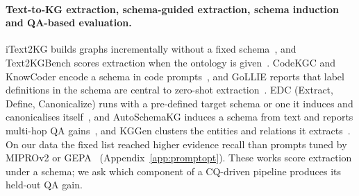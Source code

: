 \paragraph{Text-to-KG extraction, schema-guided extraction, schema induction and QA-based evaluation.}
iText2KG builds graphs incrementally without a fixed schema~\cite{lairgi2024itext2kg}, and Text2KGBench scores extraction when the ontology is given~\cite{mihindukulasooriya2023text2kgbench}. CodeKGC and KnowCoder encode a schema in code prompts~\cite{bi2024codekgc,li2024knowcoder}, and GoLLIE reports that label definitions in the schema are central to zero-shot extraction~\cite{sainz2024gollie}. EDC (Extract, Define, Canonicalize) runs with a pre-defined target schema or one it induces and canonicalises itself~\cite{zhang2024edc}, and AutoSchemaKG induces a schema from text and reports multi-hop QA gains~\cite{bai2026autoschemakg}, and KGGen clusters the entities and relations it extracts~\cite{mo2025kggen}. On our data the fixed list reached higher evidence recall than prompts tuned by MIPROv2 or GEPA~\cite{opsahlong2024mipro,agrawal2025gepa} (Appendix~\ref{app:promptopt}). These works score extraction under a schema; we ask which component of a CQ-driven pipeline produces its held-out QA gain.
